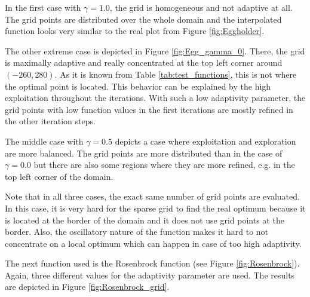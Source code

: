 In the first case with $ \gamma = 1.0 $, the grid is homogeneous and not adaptive at all. The grid points are distributed over the whole domain and the interpolated function looks very similar to the real plot from Figure \ref{fig:Eggholder}. 

The other extreme case is depicted in Figure \ref{fig:Egg_gamma_0}. There, the grid is maximally adaptive and really concentrated at the top left corner around $ (-260, 280) $. As it is known from Table \ref{tab:test_functions}, this is not where the optimal point is located. This behavior can be explained by the high exploitation throughout the iterations. With such a low adaptivity parameter, the grid points with low function values in the first iterations are mostly refined in the other iteration steps. 

The middle case with $ \gamma = 0.5 $ depicts a case where exploitation and exploration are more balanced. The grid points are more distributed than in the case of $ \gamma = 0.0 $ but there are also some regions where they are more refined, e.g. in the top left corner of the domain.

Note that in all three cases, the exact same number of grid points are evaluated. In this case, it is very hard for the sparse grid to find the real optimum because it is located at the border of the domain and it does not use grid points at the border. Also, the oscillatory nature of the function makes it hard to not concentrate on a local optimum which can happen in case of too high adaptivity. \newline

The next function used is the Rosenbrock function (see Figure \ref{fig:Rosenbrock}). Again, three different values for the adaptivity parameter are used. The results are depicted in Figure \ref{fig:Rosenbrock_grid}.

